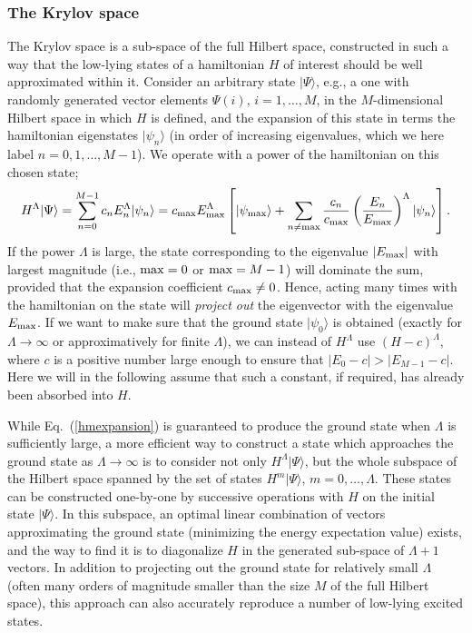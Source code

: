 \documentclass[draft,numberedheadings]{aipproc}
\begin{document}
\subsubsection{The Krylov space}

The Krylov space is a sub-space of the full Hilbert space, constructed in such a way that the low-lying states of a hamiltonian $H$ of 
interest should be well approximated within it. Consider an arbitrary state $|\Psi\rangle$, e.g., a one with randomly generated vector elements
$\Psi(i)$, $i=1,\ldots,M$, in the $M$-dimensional Hilbert space in which $H$ is defined, and the expansion of this state in terms the hamiltonian 
eigenstates $|\psi_n\rangle$ (in order of increasing eigenvalues, which we here label $n=0,1,\ldots,M-1$). 
We operate with a power of the hamiltonian on this chosen state;
\begin{equation}
H^\Lambda|\Psi \rangle = \sum_{n=0}^{M-1} c_n E^\Lambda_n |\psi_n\rangle = c_{\rm max}E^\Lambda_{\rm max}\left [ 
|\psi_{\rm max}\rangle + \sum_{n \not= {\rm max}} \frac{c_n}{c_{\rm max}} \left (\frac{E_n}{E_{\rm max}} \right )^\Lambda |\psi_n\rangle \right ]. 
\label{hmexpansion}
\end{equation}
If the power $\Lambda$ is large, the state corresponding to the eigenvalue $|E_{\rm max}|$ with largest magnitude (i.e., ${\rm max}=0$ or ${\rm max}=M-1$) will 
dominate the sum, provided that the expansion coefficient $c_{\rm max} \not=0$. Hence, acting many times with the hamiltonian on the state will 
{\it project out} the eigenvector with the eigenvalue $E_{\rm max}$. If we want to make sure that the ground state $|\psi_0\rangle$ is obtained 
(exactly for $\Lambda \to \infty$ or approximatively for finite $\Lambda$), we can instead of $H^\Lambda$ use $(H-c)^\Lambda$, where $c$ is a positive number 
large enough to ensure that $|E_0-c| > |E_{M-1}-c|$. Here we will in the following assume that such a constant, if required, has already been absorbed 
into $H$.

While Eq.~(\ref{hmexpansion}) is guaranteed to produce the ground state when $\Lambda$ is sufficiently large,
a more efficient way to construct a state which approaches the ground state as $\Lambda\to \infty$ is to consider not only $H^\Lambda|\Psi\rangle$, but
the whole subspace of the Hilbert space spanned by the set of states $H^m|\Psi\rangle$, $m=0,\ldots, \Lambda$. These states can be constructed one-by-one by 
successive operations with $H$ on the initial state $|\Psi\rangle$. In this subspace, an optimal linear combination of vectors approximating the ground state 
(minimizing the energy expectation value) exists, and the way to find it is to diagonalize $H$ in the generated sub-space of $\Lambda+1$ vectors. In addition 
to projecting out the ground state for relatively small $\Lambda$ (often many orders of magnitude smaller than the size $M$ of the full Hilbert space), this 
approach can also accurately reproduce a number of low-lying excited states. 
\end{document}

